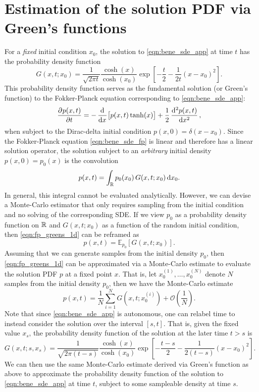\section{Estimation of the solution PDF via Green's functions}
For a \emph{fixed} initial condition \(x_0\), the solution to \cref{eqn:bene_sde_app} at time \(t\) has the probability density function
\[
	G\!\left(x, t; x_0\right) = \frac{1}{\sqrt{2\pi t}}\frac{\cosh\!\left(x\right)}{\cosh\!\left(x_0\right)}\exp\!\left[-\frac{t}{2} - \frac{1}{2t}\left(x - x_0\right)^2\right].
\]
This probability density function serves as the fundamental solution (or Green's function) to the Fokker-Planck equation corresponding to \cref{eqn:bene_sde_app}:
\begin{equation}\label{eqn:bene_sde_fp}
	\dpd{p(x,t)}{t} = -\dod{}{x}\!\left[p(x,t)\tanh\!\left(x\right)\right] + \frac12\dod[2]{p(x,t)}{x},
\end{equation}
when subject to the Dirac-delta initial condition \(p(x,0) = \delta(x - x_0)\).
Since the Fokker-Planck equation \cref{eqn:bene_sde_fp} is linear and therefore has a linear solution operator, the solution subject to an \emph{arbitrary} initial density \(p(x,0) = p_0(x)\) is the convolution
\begin{equation}\label{eqn:fp_greens_1d}
	p(x,t) = \int_{\R}{p_0\!\left(x_0\right)G\!\left(x, t; x_0\right)\dif x_0}.
\end{equation}
In general, this integral cannot be evaluated analytically.
However, we can devise a Monte-Carlo estimator that only requires sampling from the initial condition and no solving of the corresponding SDE.
If we view \(p_0\) as a probability density function on \(\mathbb{R}\) and \(G\!\left(x,t; x_0\right)\) as a function of the random initial condition, then \cref{eqn:fp_greens_1d} can be reframed as
\[
	p(x,t) = \mathds{E}_{p_0}\!\left[G\!\left(x, t; x_0\right)\right].
\]
Assuming that we can generate samples from the initial density \(p_0\), then \cref{eqn:fp_greens_1d} can be approximated via a Monte-Carlo estimate to evaluate the solution PDF \(p\) at a fixed point \(x\).
That is, let \(x_0^{(1)}, \dotsc, x_0^{(N)}\) denote \(N\) samples from the initial density \(p_0\), then we have the Monte-Carlo estimate
\[
	p(x,t) = \frac{1}{N}\sum_{i=1}^{N}{G\!\left(x, t; x_0^{(i)}\right)} + \mathcal{O}\!\left(\frac{1}{N}\right).
\]
Note that since \cref{eqn:bene_sde_app} is autonomous, one can relabel time to instead consider the solution over the interval \([s,t]\).
That is, given the fixed value \(x_s\), the probability density function of the solution at the later time \(t > s\) is
\[
	G\!\left(x, t; s, x_s\right) = \frac{1}{\sqrt{2\pi (t - s)}}\frac{\cosh\!\left(x\right)}{\cosh\!\left(x_0\right)}\exp\!\left[-\frac{t - s}{2} - \frac{1}{2(t - s)}\left(x - x_0\right)^2\right].
\]
We can then use the same Monte-Carlo estimate derived via Green's function as above to approximate the probability density function of the solution to \cref{eqn:bene_sde_app} at time \(t\), subject to some sampleable density at time \(s\).

